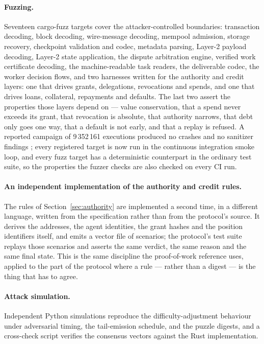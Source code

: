 \documentclass{article}
\begin{document}
\paragraph{Fuzzing.} Seventeen cargo-fuzz targets cover the attacker-controlled
boundaries: transaction decoding, block decoding, wire-message decoding,
mempool admission, storage recovery, checkpoint validation and codec, metadata
parsing, Layer-2 payload decoding, Layer-2 state application, the dispute
arbitration engine, verified work certificate decoding, the machine-readable
task readers, the deliverable codec, the worker decision flows, and two
harnesses written for the authority and credit layers: one that drives grants,
delegations, revocations and spends, and one that drives loans, collateral,
repayments and defaults. The last two assert the properties those layers
depend on --- value conservation, that a spend never exceeds its grant, that
revocation is absolute, that authority narrows, that debt only goes one way,
that a default is not early, and that a replay is refused. A reported campaign
of 9\,352\,161
executions produced no crashes and no sanitizer findings
\cite{srct-fuzz}; every registered target is now run in the continuous
integration smoke loop, and every fuzz target has a deterministic counterpart in
the ordinary test suite, so the properties the fuzzer checks are also checked on
every CI run.

\paragraph{An independent implementation of the authority and credit rules.}
The rules of Section~\ref{sec:authority} are implemented a second time, in a
different language, written from the specification rather than from the
protocol's source. It derives the addresses, the agent identities, the grant
hashes and the position identifiers itself, and emits a vector file of
scenarios; the protocol's test suite replays those scenarios and asserts the
same verdict, the same reason and the same final state. This is the same
discipline the proof-of-work reference uses, applied to the part of the
protocol where a rule --- rather than a digest --- is the thing that has to
agree.

\paragraph{Attack simulation.} Independent Python simulations reproduce the
difficulty-adjustment behaviour under adversarial timing, the tail-emission
schedule, and the puzzle digests, and a cross-check script verifies the
consensus vectors against the Rust implementation.
\end{document}
